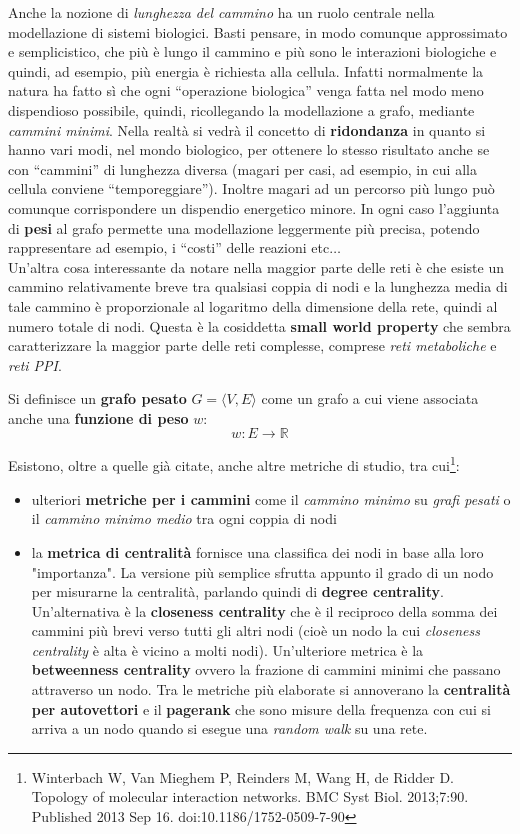 \documentclass[a4paper,12pt, oneside]{book}
\begin{document}
Anche la nozione di \textit{lunghezza del cammino}  ha un ruolo centrale nella
modellazione di sistemi biologici. Basti pensare, in modo comunque approssimato
e semplicistico, che più è lungo il cammino e più sono le interazioni biologiche
e quindi, ad esempio, più energia è richiesta alla cellula. Infatti normalmente
la natura ha fatto sì che ogni ``operazione biologica'' venga fatta nel modo
meno dispendioso possibile, quindi, ricollegando la modellazione a grafo,
mediante \textit{cammini minimi}. Nella realtà si vedrà il concetto di
\textbf{ridondanza} in quanto si hanno vari modi, nel mondo biologico, per
ottenere lo stesso risultato anche se con ``cammini'' di lunghezza diversa
(magari per casi, ad esempio, in cui alla cellula conviene
``temporeggiare''). Inoltre magari ad un percorso più lungo può comunque
corrispondere un dispendio energetico minore. In ogni caso l'aggiunta di
\textbf{pesi} al grafo permette 
una modellazione leggermente più precisa, potendo rappresentare ad esempio, i
``costi'' delle reazioni etc$\ldots$\\
Un'altra cosa interessante da notare nella maggior parte delle reti è che
esiste un cammino relativamente breve tra qualsiasi coppia di nodi e la
lunghezza media di tale cammino è proporzionale al logaritmo della dimensione
della rete, quindi al numero totale di nodi. Questa è la cosiddetta
\textbf{small world property} che sembra caratterizzare la maggior parte delle
reti complesse, comprese \textit{reti metaboliche} e \textit{reti PPI}.
\begin{definizione}
  Si definisce un \textbf{grafo pesato} $G=\langle V,E\rangle$ come un grafo a
  cui viene associata anche una \textbf{funzione di peso} $w$:
  \[w:E\to\mathbb{R}\]
\end{definizione}
Esistono, oltre a quelle già citate, anche altre metriche di studio, tra
cui\footnote{Winterbach W, Van Mieghem P, Reinders M, Wang H, de Ridder
  D. Topology of molecular interaction networks. BMC Syst
  Biol. 2013;7:90. Published 2013 Sep 16. doi:10.1186/1752-0509-7-90}: 
\begin{itemize}
  \item ulteriori \textbf{metriche per i cammini} come il \textit{cammino
    minimo} su \textit{grafi pesati} o il \textit{cammino minimo medio} tra
  ogni coppia di nodi
  \item la \textbf{metrica di centralità} fornisce una classifica dei nodi in
  base alla loro "importanza". La versione più semplice sfrutta appunto il grado
  di un nodo per misurarne la centralità, parlando quindi di \textbf{degree
    centrality}. Un'alternativa è la \textbf{closeness centrality} che è il
  reciproco della somma dei cammini più brevi verso tutti gli altri nodi (cioè
  un nodo la cui \textit{closeness centrality} è alta è vicino a molti
  nodi). Un'ulteriore metrica è la \textbf{betweenness centrality} ovvero la
  frazione di cammini minimi che passano attraverso un nodo. Tra le metriche più
  elaborate si annoverano la \textbf{centralità per autovettori} e il
  \textbf{pagerank} che sono misure della frequenza con cui si arriva a un nodo
  quando si esegue una \textit{random walk} su una rete.  
\end{itemize}
\end{document}

